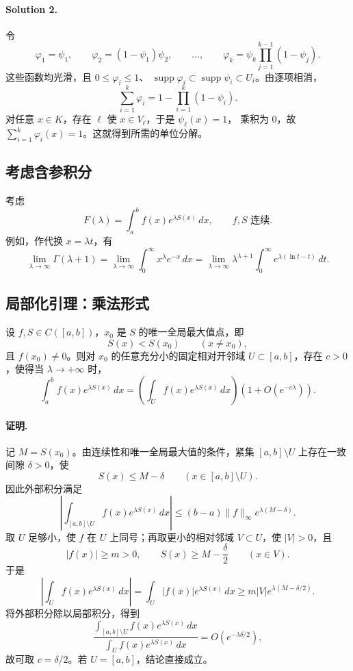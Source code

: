 \documentclass[11pt,a4paper]{ctexart}
\newcommand{\supp}{\operatorname{supp}}
\begin{document}
\paragraph{Solution 2.}
令
\[
 \varphi_1=\psi_1,\qquad
 \varphi_2=(1-\psi_1)\psi_2,\qquad\ldots,\qquad
 \varphi_k=\psi_k\prod_{j=1}^{k-1}(1-\psi_j).
\]
这些函数均光滑，且 $0\leq\varphi_i\leq1$、
$\supp\varphi_i\subset\supp\psi_i\subset U_i$。由逐项相消，
\[
 \sum_{i=1}^k\varphi_i
 =1-\prod_{i=1}^k(1-\psi_i).
\]
对任意 $x\in K$，存在 $\ell$ 使 $x\in V_\ell$，于是 $\psi_\ell(x)=1$，
乘积为 $0$，故 $\sum_{i=1}^k\varphi_i(x)=1$。这就得到所需的单位分解。

\subsection*{考虑含参积分}
考虑
\[
 F(\lambda)=\int_a^b f(x)e^{\lambda S(x)}\,dx,
 \qquad f,S\text{ 连续}.
\]
例如，作代换 $x=\lambda t$，有
\[
 \lim_{\lambda\to\infty}\Gamma(\lambda+1)
 =\lim_{\lambda\to\infty}\int_0^\infty x^\lambda e^{-x}\,dx
 =\lim_{\lambda\to\infty}\lambda^{\lambda+1}
   \int_0^\infty e^{\lambda(\ln t-t)}\,dt.
\]

\subsection*{局部化引理：乘法形式}
设 $f,S\in C([a,b])$，$x_0$ 是 $S$ 的唯一全局最大值点，即
\[
 S(x)<S(x_0)\qquad(x\ne x_0),
\]
且 $f(x_0)\ne0$。则对 $x_0$ 的任意充分小的固定相对开邻域
$U\subset[a,b]$，存在 $c>0$，使得当 $\lambda\to+\infty$ 时，
\[
 \boxed{
 \int_a^b f(x)e^{\lambda S(x)}\,dx
 =\left(\int_U f(x)e^{\lambda S(x)}\,dx\right)
   \left(1+O(e^{-c\lambda})\right).
 }
\]

\paragraph{证明.}
记 $M=S(x_0)$。由连续性和唯一全局最大值的条件，紧集
$[a,b]\setminus U$ 上存在一致间隙 $\delta>0$，使
\[
 S(x)\le M-\delta\qquad(x\in[a,b]\setminus U).
\]
因此外部积分满足
\[
 \left|\int_{[a,b]\setminus U}f(x)e^{\lambda S(x)}\,dx\right|
 \le (b-a)\|f\|_\infty e^{\lambda(M-\delta)}.
\]
取 $U$ 足够小，使 $f$ 在 $U$ 上同号；再取更小的相对邻域
$V\subset U$，使 $|V|>0$，且
\[
 |f(x)|\ge m>0,\qquad S(x)\ge M-\frac\delta2
 \qquad(x\in V).
\]
于是
\[
 \left|\int_U f(x)e^{\lambda S(x)}\,dx\right|
 =\int_U |f(x)|e^{\lambda S(x)}\,dx
 \ge m|V|e^{\lambda(M-\delta/2)}.
\]
将外部积分除以局部积分，得到
\[
 \frac{\displaystyle\int_{[a,b]\setminus U}f(x)e^{\lambda S(x)}\,dx}
 {\displaystyle\int_U f(x)e^{\lambda S(x)}\,dx}
 =O(e^{-\lambda\delta/2}),
\]
故可取 $c=\delta/2$。若 $U=[a,b]$，结论直接成立。
\end{document}
